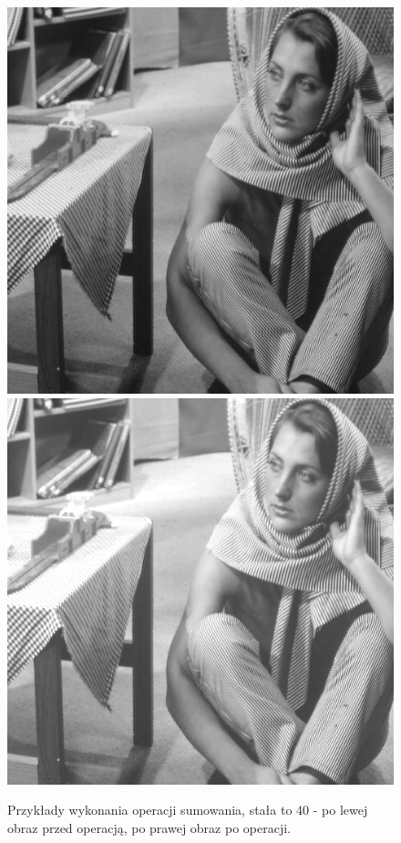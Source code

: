 \documentclass{article}
\begin{document}
\begin{figure}[!htb]
\centering
\includegraphics[scale=0.2]{img/barbara_8bit.png} 
\includegraphics[scale=0.2]{img/_Sumowanie_Obrazka_barbara_8bit.png}
\caption{Przykłady wykonania operacji sumowania, stała to 40 - po lewej obraz przed operacją, po prawej obraz po operacji. }
\label{fig:verticalcell}
\end{figure}
\end{document}
